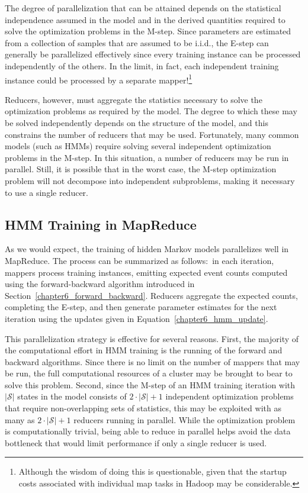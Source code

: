 \noindent The degree of parallelization that can be attained depends
on the statistical independence assumed in the model and in the
derived quantities required to solve the optimization problems in the
M-step.  Since parameters are estimated from a collection of samples
that are assumed to be i.i.d., the E-step can generally be
parallelized effectively since every training instance can be
processed independently of the others.  In the limit, in fact, each
independent training instance could be processed by a separate
mapper!\footnote{Although the wisdom of doing this is questionable,
  given that the startup costs associated with individual map tasks in
  Hadoop may be considerable.}

Reducers, however, must aggregate the statistics necessary to solve
the optimization problems as required by the model.  The degree to
which these may be solved independently depends on the structure of
the model, and this constrains the number of reducers that may be
used.  Fortunately, many common models (such as HMMs) require solving
several independent optimization problems in the M-step.  In this
situation, a number of reducers may be run in parallel.  Still, it is
possible that in the worst case, the M-step optimization problem will
not decompose into independent subproblems, making it necessary to use
a single reducer.

\subsection{HMM Training in MapReduce}

As we would expect, the training of hidden Markov models parallelizes
well in MapReduce.  The process can be summarized as follows:\ in each
iteration, mappers process training instances, emitting expected event
counts computed using the forward-backward algorithm introduced in
Section~\ref{chapter6_forward_backward}.  Reducers aggregate the
expected counts, completing the E-step, and then generate parameter
estimates for the next iteration using the updates given in
Equation~\ref{chapter6_hmm_update}.

This parallelization strategy is effective for several reasons.
First, the majority of the computational effort in HMM training is the
running of the forward and backward algorithms.  Since there is no
limit on the number of mappers that may be run, the full computational
resources of a cluster may be brought to bear to solve this problem.
Second, since the M-step of an HMM training iteration with
$|\mathcal{S}|$ states in the model consists of $2\cdot |\mathcal{S}|
+ 1$ independent optimization problems that require non-overlapping
sets of statistics, this may be exploited with as many as $2\cdot
|\mathcal{S}| + 1$ reducers running in parallel.  While the
optimization problem is computationally trivial, being able to reduce
in parallel helps avoid the data bottleneck that would limit
performance if only a single reducer is used.

